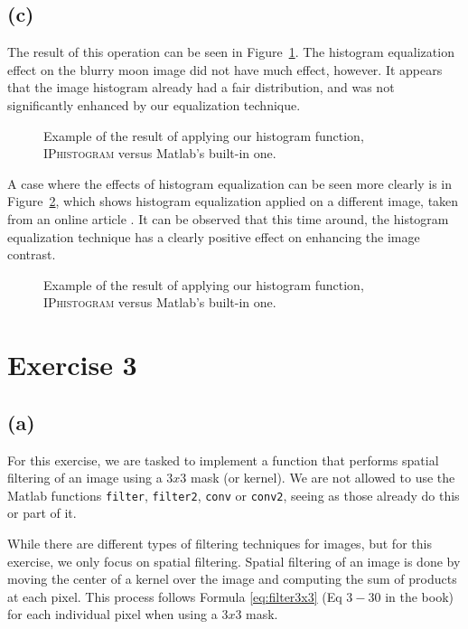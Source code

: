 \documentclass{article}
\begin{document}
\subsection*{(c)} The result of this operation can be seen in Figure~\ref{fig:histeq}. The histogram equalization effect on the blurry moon image did not have much effect, however. It appears that the image histogram already had a fair distribution, and was not significantly enhanced by our equalization technique.
\begin{figure}[ht]
    \centering
    
    \caption{Example of the result of applying our histogram function, \textsc{IPhistogram} versus Matlab's built-in one.}
    \label{fig:histeq}
\end{figure}

A case where the effects of histogram equalization can be seen more clearly is in Figure~\ref{fig:histeq_2}, which shows histogram equalization applied on a different image, taken from an online article \citep{wiki:Histogram_equalization}. It can be observed that this time around, the histogram equalization technique has a clearly positive effect on enhancing the image contrast.

\begin{figure}[ht]
    \centering
    
    \caption{Example of the result of applying our histogram function, \textsc{IPhistogram} versus Matlab's built-in one.}
    \label{fig:histeq_2}
\end{figure}

\newpage
\section*{Exercise 3}
\subsection*{(a)}
For this exercise, we are tasked to implement a function that performs spatial filtering of an image using a $3x3$ mask (or kernel). We are not allowed to use the Matlab functions \texttt{filter}, \texttt{filter2}, \texttt{conv} or \texttt{conv2}, seeing as those already do this or part of it.

While there are different types of filtering techniques for images, but for this exercise, we only focus on spatial filtering. Spatial filtering of an image is done by moving the center of a kernel over the image and computing the sum of products at each pixel. This process follows Formula \ref{eq:filter3x3} (Eq $3-30$ in the book) for each individual pixel when using a $3x3$ mask.
\end{document}

